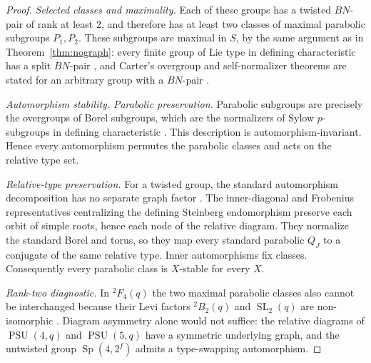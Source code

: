 \documentclass[11pt]{amsart}
\theoremstyle{definition}
\theoremstyle{remark}
\DeclareMathOperator{\PSU}{PSU}
\DeclareMathOperator{\Sp}{Sp}
\DeclareMathOperator{\SL}{SL}
\begin{document}
\begin{proof}
\emph{Selected classes and maximality.} Each of these groups has a twisted $BN$-pair of rank at least $2$, and
therefore has at least two classes of maximal parabolic subgroups $P_1,P_2$.
These subgroups are maximal in $S$, by the same argument as
in Theorem~\ref{thm:nograph}: every finite group of Lie type in defining
characteristic has a split $BN$-pair
\cite[Example~1.16 and \S1.3.5, pp.~10--11]{Hiss2011}, and Carter's
overgroup and self-normalizer theorems are stated for an arbitrary group
with a $BN$-pair \cite[Thms.~8.3.2--8.3.3, p.~112]{Carter}.

\emph{Automorphism stability.}
\emph{Parabolic preservation.} Parabolic subgroups are precisely the
overgroups of Borel subgroups, which are the normalizers of Sylow
$p$-subgroups in defining characteristic
\cite[Example~1.16 and \S1.3.5, pp.~10--11]{Hiss2011}. This description is
automorphism-invariant. Hence every automorphism permutes the parabolic
classes and acts on the relative type set.

\emph{Relative-type preservation.} For a twisted group, the standard
automorphism decomposition has no separate graph factor
\cite[Def.~3.3 and Thm.~3.4, p.~32]{BrotoMollerOliver2019}. The
inner-diagonal and Frobenius representatives centralizing the defining
Steinberg endomorphism preserve each orbit of simple roots, hence each node of
the relative diagram. They normalize the standard Borel and torus, so they
map every standard parabolic $Q_J$ to a conjugate of the same relative type.
Inner automorphisms fix classes. Consequently every parabolic class is
$X$-stable for every $X$.

\emph{Rank-two diagnostic.} In ${}^2F_4(q)$ the two maximal parabolic
classes also cannot be interchanged because their Levi factors
${}^2B_2(q)$ and $\SL_2(q)$ are non-isomorphic
\cite[Thm.~4.5(i)--(ii), p.~166]{Wilson2009}. Diagram asymmetry alone would
not suffice: the relative diagrams of $\PSU(4,q)$ and $\PSU(5,q)$ have a
symmetric underlying graph, and the untwisted group $\Sp(4,2^f)$ admits a
type-swapping automorphism.


\end{proof}
\end{document}
